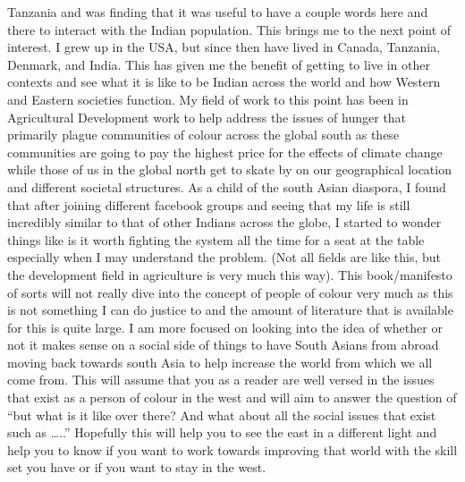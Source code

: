 Tanzania and was finding that it was useful to have a couple words here and there to interact with the Indian population. This brings me to the next point of interest. I grew up in the USA, but since then have lived in Canada, Tanzania, Denmark, and India. This has given me the benefit of getting to live in other contexts and see what it is like to be Indian across the world and how Western and Eastern societies function. My field of work to this point has been in Agricultural Development work to help address the issues of hunger that primarily plague communities of colour across the global south as these communities are going to pay the highest price for the effects of climate change while those of us in the global north get to skate by on our geographical location and different societal structures. As a child of the south Asian diaspora, I found that after joining different facebook groups and seeing that my life is still incredibly similar to that of other Indians across the globe, I started to wonder things like is it worth fighting the system all the time for a seat at the table especially when I may understand the problem. (Not all fields are like this, but the development field in agriculture is very much this way). This book/manifesto of sorts will not really dive into the concept of people of colour very much as this is not something I can do justice to and the amount of literature that is available for this is quite large. I am more focused on looking into the idea of whether or not it makes sense on a social side of things to have South Asians from abroad moving back towards south Asia to help increase the world from which we all come from. This will assume that you as a reader are well versed in the issues that exist as a person of colour in the west and will aim to answer the question of “but what is it like over there? And what about all the social issues that exist such as …..” Hopefully this will help you to see the east in a different light and help you to know if you want to work towards improving that world with the skill set you have or if you want to stay in the west. 
